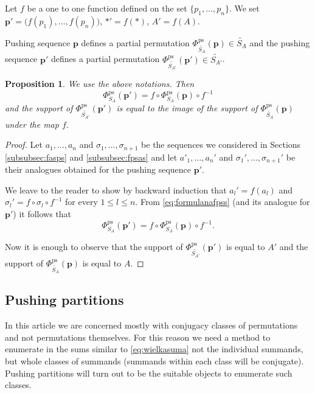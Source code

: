 \documentclass[12pt,dvips]{amsart}
\numberwithin{equation}{section} \numberwithin{figure}{section}
\theoremstyle{plain}
\newtheorem{proposition}[lemma]{Proposition}
\theoremstyle{definition}
\theoremstyle{remark}
\newcommand{\ppp}{{\mathbf{p}}}
\newcommand{\Sn}[1]{{{S}}_{#1}}
\newcommand{\xtra}{\ast}
\newcommand{\fpssSym}{\Phi^{\ps}_{\Sn{A}}}
\newcommand{\PartPerm}[1]{\widetilde{\Sn{#1}}}
\DeclareMathOperator{\ps}{ps}
\begin{document}
Let $f$ be a one to one function defined on the set
$\{p_1,\dots,p_n\}$. We set $\ppp'=\big( f(p_1),\dots,f(p_n) \big)$,
$\xtra'=f(\xtra)$, $A'=f(A)$.

Pushing sequence $\ppp$ defines a partial permutation
$\Phi^{\ps}_{\PartPerm{A}}(\ppp)\in \PartPerm{A}$ and the pushing
sequence $\ppp'$ defines a partial permutation
$\Phi^{\ps}_{\PartPerm{A'}}(\ppp')\in \PartPerm{A'}$.

\begin{proposition}
\label{prop:zmianaoznaczen} We use the above notations. Then
$$\fpssSym(\ppp')=f\circ \fpssSym(\ppp) \circ f^{-1}$$
and the support of $\Phi^{\ps}_{\PartPerm{A'}}(\ppp')$ is equal to
the image of the support of $\Phi^{\ps}_{\PartPerm{A}}(\ppp)$ under
the map $f$.
%
\end{proposition}
\begin{proof}
Let $a_1,\dots,a_n$ and $\sigma_1,\dots,\sigma_{n+1}$ be the
sequences we considered in Sections \ref{subsubsec:fasps} and
\ref{subsubsec:fpsas} and let $a'_1,\dots,a_n'$ and
$\sigma_1',\dots,\sigma_{n+1}'$ be their analogues obtained for the
pushing sequence $\ppp'$.

We leave to the reader to show by backward induction that
$a_l'=f(a_l)$ and $\sigma_l'= f\circ \sigma_l \circ f^{-1}$ for
every $1\leq l\leq n$. From \eqref{eq:formulanafpss} (and its
analogue for $\ppp'$) it follows that
$$\fpssSym(\ppp')=f\circ \fpssSym(\ppp) \circ f^{-1}.$$

Now it is enough to observe that the support of
$\Phi^{\ps}_{\PartPerm{A'}}(\ppp')$ is equal to $A'$ and the support
of $\Phi^{\ps}_{\PartPerm{A}}(\ppp)$ is equal to $A$.
\end{proof}

\subsection{Pushing partitions}
In this article we are concerned mostly with conjugacy classes of
permutations and not permutations themselves. For this reason we
need a method to enumerate in the sums similar to
\eqref{eq:wielkasuma} not the individual summands, but whole classes
of summands (summands within each class will be conjugate). Pushing
partitions will turn out to be the suitable objects to enumerate
such classes.
\end{document}
